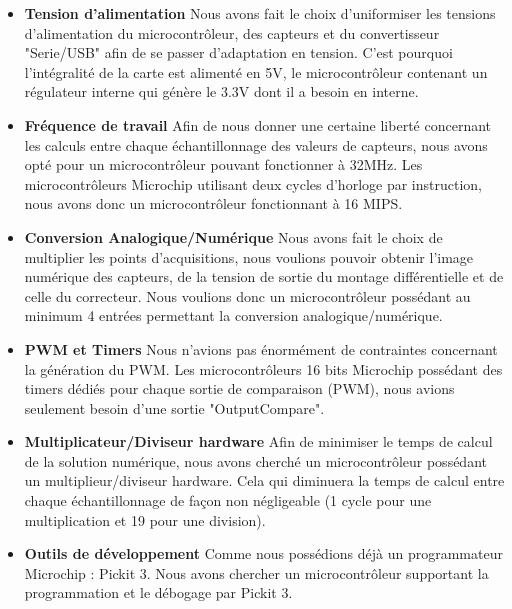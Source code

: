 \documentclass[11pt, french]{article} %
\begin{document}
\begin{itemize}
	\item \textbf{Tension d'alimentation}
	Nous avons fait le choix d'uniformiser les tensions d'alimentation du microcontrôleur, des capteurs et du convertisseur "Serie/USB" afin de se passer d'adaptation en tension. C'est pourquoi l'intégralité de la carte est alimenté en 5V, le microcontrôleur contenant un régulateur interne qui génère le 3.3V dont il a besoin en interne.
\vspace{0.5cm}
	\item \textbf{Fréquence de travail}
	Afin de nous donner une certaine liberté concernant les calculs entre chaque échantillonnage des valeurs de capteurs, nous avons opté pour un microcontrôleur pouvant fonctionner à 32MHz. Les microcontrôleurs Microchip utilisant deux cycles d'horloge par instruction, nous avons donc un microcontrôleur fonctionnant à 16 MIPS. 
\vspace{0.5cm}
	\item \textbf{Conversion Analogique/Numérique}
 	Nous avons fait le choix de multiplier les points d'acquisitions, nous voulions pouvoir obtenir l'image numérique des capteurs, de la tension de sortie du montage différentielle et de celle du correcteur. Nous voulions donc un microcontrôleur possédant au minimum 4 entrées permettant la conversion analogique/numérique.
\vspace{0.5cm}
	\item \textbf{PWM et Timers} 
	Nous n'avions pas énormément de contraintes concernant la génération du PWM. Les microcontrôleurs 16 bits Microchip possédant des timers dédiés pour chaque sortie de comparaison (PWM), nous avions seulement besoin d'une sortie "OutputCompare".
\vspace{0.5cm}
	\item \textbf{Multiplicateur/Diviseur hardware}
	Afin de minimiser le temps de calcul de la solution numérique, nous avons cherché un microcontrôleur possédant un multiplieur/diviseur hardware. Cela qui diminuera la temps de calcul entre chaque échantillonnage de façon non négligeable (1 cycle pour une multiplication et 19 pour une division).
\vspace{0.5cm}
	\item \textbf{Outils de développement}
	Comme nous possédions déjà un programmateur Microchip : Pickit 3. Nous avons chercher un microcontrôleur supportant la programmation et le débogage par Pickit 3.
\vspace{0.5cm}
\end{itemize}
\end{document}
